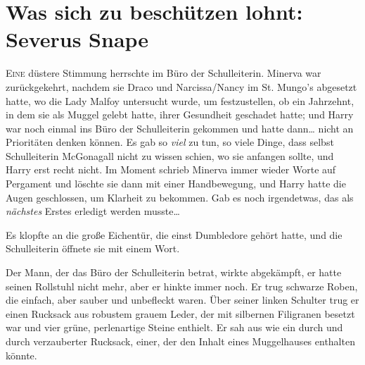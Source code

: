 \chapter{Was sich zu beschützen lohnt: Severus Snape}

\lettrine{E}{ine} düstere Stimmung herrschte im Büro der Schulleiterin. Minerva war zurückgekehrt, nachdem sie Draco und Narcissa/Nancy im St. Mungo's abgesetzt hatte, wo die Lady Malfoy untersucht wurde, um festzustellen, ob ein Jahrzehnt, in dem sie als Muggel gelebt hatte, ihrer Gesundheit geschadet hatte; und Harry war noch einmal ins Büro der Schulleiterin gekommen und hatte dann… nicht an Prioritäten denken können. Es gab so \emph{viel} zu tun, so viele Dinge, dass selbst Schulleiterin McGonagall nicht zu wissen schien, wo sie anfangen sollte, und Harry erst recht nicht. Im Moment schrieb Minerva immer wieder Worte auf Pergament und löschte sie dann mit einer Handbewegung, und Harry hatte die Augen geschlossen, um Klarheit zu bekommen.
Gab es noch irgendetwas, das als \emph{nächstes} Erstes erledigt werden musste…

Es klopfte an die große Eichentür, die einst Dumbledore gehört hatte, und die Schulleiterin öffnete sie mit einem Wort.

Der Mann, der das Büro der Schulleiterin betrat, wirkte abgekämpft, er hatte seinen Rollstuhl nicht mehr, aber er hinkte immer noch. Er trug schwarze Roben, die einfach, aber sauber und unbefleckt waren. Über seiner linken Schulter trug er einen Rucksack aus robustem grauem Leder, der mit silbernen Filigranen besetzt war und vier grüne, perlenartige Steine enthielt. Er sah aus wie ein durch und durch verzauberter Rucksack, einer, der den Inhalt eines Muggelhauses enthalten könnte.

